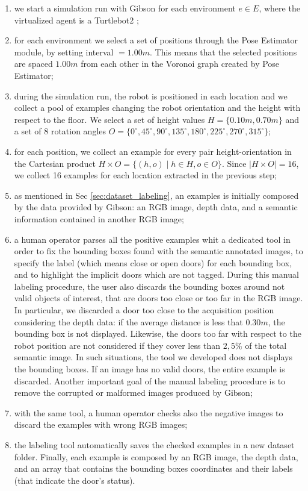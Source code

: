 \begin{enumerate}
	\item we start a simulation run with Gibson for each environment $e \in E$, where the virtualized agent is a Turtlebot2 \cite{turtlebot2};
	\item for each environment we select a set of positions through the Pose Estimator module, by setting \textsf{interval} $= 1.00m$. This means that the selected positions are spaced $1.00m$ from each other in the Voronoi graph created by Pose Estimator;
	\item during the simulation run, the robot is positioned in each location and we collect a pool of examples changing the robot orientation and the height with respect to the floor. We select a set of height values $H = \{0.10m, 0.70m\}$ and a set of 8 rotation angles $O = \{0^{\circ}, 45^{\circ}, 90^{\circ}, 135^{\circ}, 180^{\circ}, 225^{\circ}, 270^{\circ}, 315^{\circ}\}$;
	\item for each position, we collect an example for every pair height-orientation in the Cartesian product $H \times O = \{(h, o) \mid h \in H, o \in O\}$. Since $|H \times O| = 16$, we collect 16 examples for each location extracted in the previous step;
	\item as mentioned in Sec \ref{sec:dataset_labeling}, an examples is initially composed by the data provided by Gibson: an RGB image, depth data, and a semantic information contained in another RGB image;
	\item a human operator parses all the positive examples whit a dedicated tool in order to fix the bounding boxes found with the semantic annotated images, to specify the label (which means close or open doors) for each bounding box, and to highlight the implicit doors which are not tagged. During this manual labeling procedure, the user also discards the bounding boxes around not valid objects of interest, that are doors too close or too far in the RGB image. In particular, we discarded a door too close to the acquisition position considering the depth data: if the average distance is less that $0.30 m$, the bounding box is not displayed. Likewise, the doors too far with respect to the robot position are not considered if they cover less than $2,5\%$ of the total semantic image. In such situations, the tool we developed does not displays the bounding boxes. If an image has no valid doors, the entire example is discarded. Another important goal of the manual labeling procedure is to remove the corrupted or malformed images produced by Gibson;
	\item with the same tool, a human operator checks also the negative images to discard the examples with wrong RGB images; 
	\item the labeling tool automatically saves the checked examples in a new dataset folder. Finally, each example is composed by an RGB image, the depth data, and an array that contains the bounding boxes coordinates and their labels (that indicate the door's status). 
\end{enumerate}

